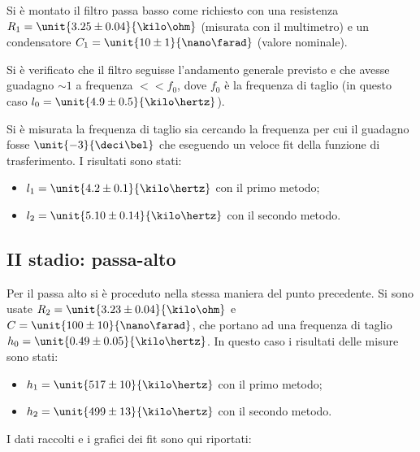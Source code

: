 \documentclass[10pt,a4paper]{article}
\begin{document}
Si è montato il filtro passa basso come richiesto con una resistenza $R_1 = \unit{3.25 \pm 0.04}{\kilo\ohm}$ (misurata con il multimetro) e un condensatore $C_1=\unit{10 \pm 1}{\nano\farad}$ (valore nominale).

Si è verificato che il filtro seguisse l'andamento generale previsto e che avesse guadagno $\sim 1$ a frequenza $<<f_0$, dove $f_0$ è la frequenza di taglio (in questo caso $l_0 = \unit{4.9 \pm 0.5}{\kilo\hertz}$).

Si è misurata la frequenza di taglio sia cercando la frequenza per cui il guadagno fosse $\unit{-3}{\deci\bel}$ che eseguendo un veloce fit della funzione di trasferimento.
I risultati sono stati:
\begin{itemize}
	\item $l_1 = \unit{4.2 \pm 0.1}{\kilo\hertz}$ con il primo metodo; %
	\item $l_2 = \unit{5.10 \pm 0.14}{\kilo\hertz}$ con il secondo metodo.
\end{itemize}

\subsection{II stadio: passa-alto}
Per il passa alto si è proceduto nella stessa maniera del punto precedente. Si sono usate $R_2=\unit{3.23 \pm 0.04}{\kilo\ohm}$ e $C=\unit{100 \pm 10}{\nano\farad}$, che portano ad una frequenza di taglio $h_0 = \unit{0.49 \pm 0.05}{\kilo\hertz}$.
In questo caso i risultati delle misure sono stati:
\begin{itemize}
	\item $h_1 = \unit{517 \pm 10}{\kilo\hertz}$ con il primo metodo;
	\item $h_2 = \unit{499 \pm 13}{\kilo\hertz}$ con il secondo metodo.
\end{itemize}

I dati raccolti e i grafici dei fit sono qui riportati:

\begin{figure}[h!]
	\centering
	\begin{minipage}[c]{0.49\textwidth}
		\resizebox{\textwidth}{!}{
			}
	\end{minipage}
\begin{minipage}[c]{0.49\textwidth}
	\resizebox{\textwidth}{!}{
		}
\end{minipage}
\end{figure}
\end{document}
